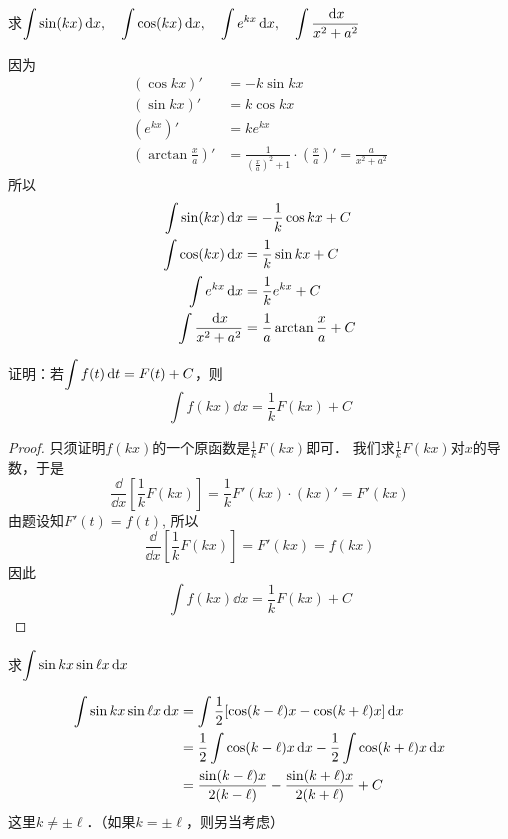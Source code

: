 \begin{example}
求$\displaystyle\int \sin (kx)\,{\rm d} x,\quad \displaystyle\int \cos(kx)\,{\rm d} x,\quad \displaystyle\int e^{kx}\,{\rm d} x,\quad \displaystyle\int \dfrac{\,{\rm d} x}{x^2+a^2}$
\end{example}

\begin{solution}
    因为
\[\begin{split}
    (\cos kx)'&=-k\sin kx\\
    (\sin kx)'&=k\cos kx\\
    (e^{kx})'&=ke^{kx}\\
    \left(\arctan\frac{x}{a}\right)'&=\frac{1}{\left(\frac{x}{a}\right)^2+1}\cdot\left(\frac{x}{a}\right)'=\frac{a}{x^2+a^2}
\end{split}\]
所以
\[\begin{split}
    \int \sin (kx)\,{\rm d} x&=-\dfrac{1}{k}\cos kx+C\\
    \displaystyle\int \cos(kx)\,{\rm d} x&=\dfrac{1}{k}\sin kx+C\\
    \displaystyle\int e^{kx}\,{\rm d} x&= \dfrac{1}{k}e^{kx}+C\\
    \displaystyle\int \dfrac{\,{\rm d} x}{x^2+a^2}&=\dfrac{1}{a}\arctan\dfrac{x}{a}+C \\
\end{split}  \]
\end{solution}

\begin{example}
    证明：若$\displaystyle\int f(t)\,{\rm d} t=F(t)+C$，则
\[\int f(kx)\dd x=\frac{1}{k}F(kx)+C\]
\end{example}

\begin{proof}
只须证明$f(kx)$的一个原函数是$\frac{1}{k}F(kx)$即可．
我们求$\frac{1}{k}F(kx)$对$x$的导数，于是
\[\frac{\dd}{\dd x}\left[\frac{1}{k}F(kx)\right]=\frac{1}{k}F'(kx)\cdot (kx)'=F'(kx)\]
由题设知$F' (t) =f (t)$, 所以
\[\frac{\dd}{\dd x}\left[\frac{1}{k}F(kx)\right]=F'(kx)=f(kx)\]
因此
\[\int f (kx) \dd x=\frac{1}{k}F (kx) +C\]
\end{proof}

\begin{example}
求$\displaystyle\int \sin kx\sin\ell x\,{\rm d} x$
\end{example}

\begin{solution}
\[\begin{split}
    \displaystyle\int \sin kx\sin\ell x\,{\rm d} x&=\int \dfrac{1}{2}[\cos(k-\ell)x-\cos(k+\ell)x]\,{\rm d} x\\
    &=\dfrac{1}{2}\int \cos (k-\ell)x\,{\rm d} x-\dfrac{1}{2}\int \cos (k+\ell)x\,{\rm d} x\\
&=\dfrac{\sin(k-\ell)x}{2(k-\ell)}-\dfrac{\sin(k+\ell)x}{2(k+\ell)}+C
\end{split}\]
    这里$k\ne \pm \ell$．（如果$k=\pm\ell$，则另当考虑）
\end{solution}


